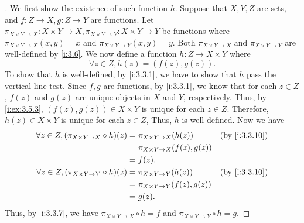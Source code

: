 \begin{proof}[]
  We first show the existence of such function \(h\).
  Suppose that \(X, Y, Z\) are sets, and \(f : Z \to X, g : Z \to Y\) are functions.
  Let \(\pi_{X \times Y \to X} : X \times Y \to X, \pi_{X \times Y \to Y} : X \times Y \to Y\) be functions where \(\pi_{X \times Y \to X}(x, y) = x\) and \(\pi_{X \times Y \to Y}(x, y) = y\).
  Both \(\pi_{X \times Y \to X}\) and \(\pi_{X \times Y \to Y}\) are well-defined by \cref{i:3.6}.
  We now define a function \(h : Z \to X \times Y\) where
  \[
    \forall z \in Z, h(z) = (f(z), g(z)).
  \]
  To show that \(h\) is well-defined, by \cref{i:3.3.1}, we have to show that \(h\) pass the vertical line test.
  Since \(f, g\) are functions, by \cref{i:3.3.1}, we know that for each \(z \in Z\), \(f(z)\) and \(g(z)\) are unique objects in \(X\) and \(Y\), respectively.
  Thus, by \cref{i:ex:3.5.3}, \((f(z), g(z)) \in X \times Y\) is unique for each \(z \in Z\).
  Therefore, \(h(z) \in X \times Y\) is unique for each \(z \in Z\),
  Thus, \(h\) is well-defined.
  Now we have
  \begin{align*}
    \forall z \in Z, (\pi_{X \times Y \to X} \circ h)(z) & = \pi_{X \times Y \to X}(h(z))       &  & \by{i:3.3.10} \\
                                                         & = \pi_{X \times Y \to X}(f(z), g(z))                    \\
                                                         & = f(z).                                                 \\
    \forall z \in Z, (\pi_{X \times Y \to Y} \circ h)(z) & = \pi_{X \times Y \to Y}(h(z))       &  & \by{i:3.3.10} \\
                                                         & = \pi_{X \times Y \to Y}(f(z), g(z))                    \\
                                                         & = g(z).
  \end{align*}
  Thus, by \cref{i:3.3.7}, we have \(\pi_{X \times Y \to X} \circ h = f\) and \(\pi_{X \times Y \to Y} \circ h = g\).


\end{proof}
